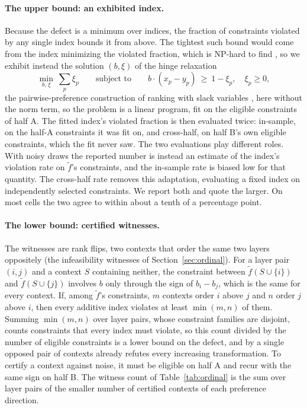\paragraph{The upper bound: an exhibited index.} Because the defect is a minimum over indices, the
fraction of constraints violated by any single index bounds it from above. The tightest such bound would
come from the index minimizing the violated fraction, which is NP-hard to find \citep{amaldi1995maxfs},
so we exhibit instead the solution $(b, \xi)$ of the hinge relaxation
\[
\min_{b,\,\xi} \ \sum_p \xi_p \qquad \text{subject to} \qquad
b\cdot(x_p - y_p) \ \ge\ 1 - \xi_p, \quad \xi_p \ge 0 ,
\]
the pairwise-preference construction of ranking with slack variables \citep{joachims2002ranking}, here
without the norm term, so the problem is a linear program, fit on the eligible constraints of half A. The
fitted index's violated fraction is then evaluated twice: in-sample, on the half-A constraints it was fit
on, and cross-half, on half B's own eligible constraints, which the fit never saw. The two evaluations
play different roles. 
With noisy draws the reported number is instead an estimate of the index's violation rate
on $\tilde f$'s constraints, and the in-sample rate is biased low for that quantity. The
cross-half rate removes this adaptation, evaluating a fixed index on independently selected constraints.
We report both and quote the larger. On most cells the two agree to within about a tenth of a percentage
point.

\paragraph{The lower bound: certified witnesses.} The witnesses are rank flips, two contexts that order
the same two layers oppositely (the infeasibility witnesses of Section~\ref{sec:ordinal}). For a layer pair
$(i,j)$ and a context $S$ containing neither, the constraint between $\tilde f(S\cup\{i\})$ and
$\tilde f(S\cup\{j\})$
involves $b$ only through the sign of $b_i - b_j$, which is the same for every context. If, among
$\tilde f$'s constraints, $m$ contexts order $i$ above $j$ and $n$ order $j$ above $i$, then every additive index
violates at least $\min(m,n)$ of them. Summing $\min(m,n)$ over layer pairs, whose constraint families are disjoint,
counts constraints that every index must violate, so this count divided by the number of eligible
constraints is a lower bound on the defect, and by \thmtwo{} a
single opposed pair of contexts already refutes every increasing transformation. To certify a context
against noise, it must be eligible on half A and recur with the same sign on half B. The witness
count
of Table~\ref{tab:ordinal} is the sum over layer pairs of the smaller number of certified contexts of
each preference direction.

